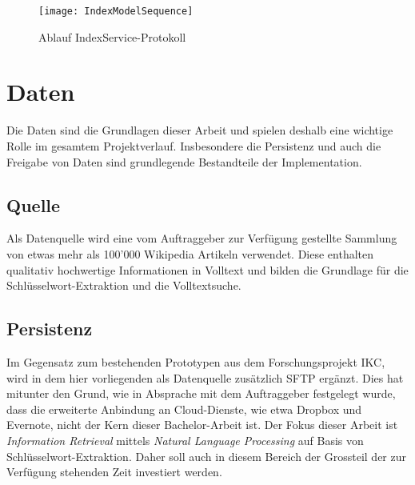     \begin{figure}[H]
    \centering
    \texttt{[image: IndexModelSequence]}
    \caption{Ablauf IndexService-Protokoll}
    \label{fig:seqindexprotocol}
    \end{figure}


\section{Daten}


Die Daten sind die Grundlagen dieser Arbeit und spielen deshalb eine wichtige Rolle im gesamtem Projektverlauf. Insbesondere die Persistenz und auch die Freigabe von Daten sind grundlegende Bestandteile der Implementation.


    
\subsection{Quelle}



Als Datenquelle wird eine vom Auftraggeber zur Verfügung gestellte Sammlung von etwas mehr als 100'000 Wikipedia Artikeln verwendet. Diese enthalten qualitativ hochwertige Informationen in Volltext und bilden die Grundlage für die Schlüsselwort-Extraktion und die Volltextsuche.


\subsection{Persistenz}



Im Gegensatz zum bestehenden Prototypen aus dem Forschungsprojekt \gls{IKC}, wird in dem hier vorliegenden als Datenquelle zusätzlich \gls{SFTP} ergänzt. Dies hat mitunter den Grund, wie in Absprache mit dem Auftraggeber festgelegt wurde, dass die erweiterte Anbindung an Cloud-Dienste, wie etwa Dropbox und Evernote, nicht der Kern dieser Bachelor-Arbeit ist. Der Fokus dieser Arbeit ist \textit{Information Retrieval} mittels \textit{Natural Language Processing} auf Basis von Schlüsselwort-Extraktion. Daher soll auch in diesem Bereich der Grossteil der zur Verfügung stehenden Zeit investiert werden. 

